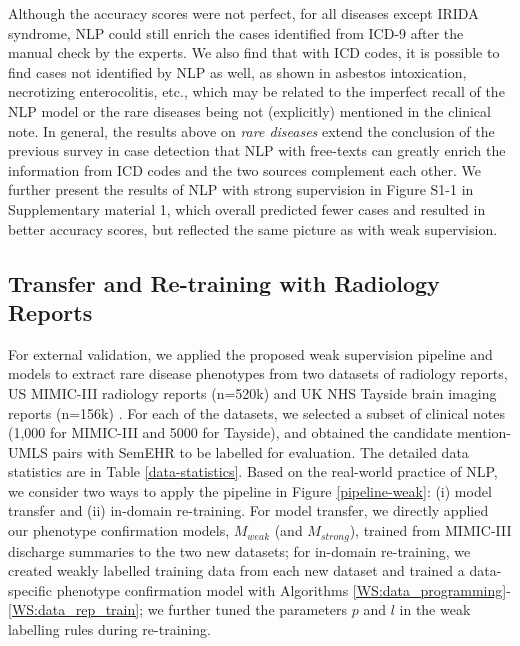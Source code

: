 \documentclass[twocolumn]{bmcart}
\begin{document}
Although the accuracy scores were not perfect, for all diseases except IRIDA syndrome, NLP could still enrich the cases identified from ICD-9 after the manual check by the experts. We also find that with ICD codes, it is possible to find cases not identified by NLP as well, as shown in asbestos intoxication, necrotizing enterocolitis, etc., which may be related to the imperfect recall of the NLP model or the rare diseases being not (explicitly) mentioned in the clinical note. In general, the results above on \textit{rare diseases} extend the conclusion of the previous survey in case detection \cite{Ford2016} that NLP with free-texts can greatly enrich the information from ICD codes and the two sources complement each other. We further present the results of NLP with strong supervision in Figure S1-1 in Supplementary material 1, which overall predicted fewer cases and resulted in better accuracy scores, but reflected the same picture as with weak supervision.

\subsection*{Transfer and Re-training with Radiology Reports}
For external validation, we applied the proposed weak supervision pipeline and models to extract rare disease phenotypes from two datasets of radiology reports, US MIMIC-III radiology reports (n=520k) \cite{johnson_mimic-iii_2016} and UK NHS Tayside brain imaging reports (n=156k) \cite{gorinski_named_2019}. For each of the datasets, we selected a subset of clinical notes (1,000 for MIMIC-III and 5000 for Tayside), and obtained the candidate mention-UMLS pairs with SemEHR to be labelled for evaluation. The detailed data statistics are in Table \ref{data-statistics}. Based on the real-world practice of NLP, we consider two ways to apply the pipeline in Figure \ref{pipeline-weak}: (i) model transfer and (ii) in-domain re-training. For model transfer, we directly applied our phenotype confirmation models, $M_{weak}$ (and $M_{strong}$), trained from MIMIC-III discharge summaries to the two new datasets; for in-domain re-training, we created weakly labelled training data from each new dataset and trained a data-specific phenotype confirmation model with Algorithms \ref{WS:data_programming}-\ref{WS:data_rep_train}; we further tuned the parameters $p$ and $l$ in the weak labelling rules during re-training.
\end{document}
